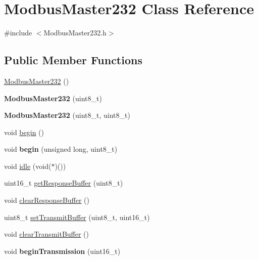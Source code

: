 \hypertarget{class_modbus_master232}{}\section{Modbus\+Master232 Class Reference}
\label{class_modbus_master232}


{\ttfamily \#include $<$Modbus\+Master232.\+h$>$}

\subsection*{Public Member Functions}
\begin{DoxyCompactItemize}
\item 
\hyperlink{class_modbus_master232_a2727d618f5d2cc3ad6a92031be79cc44}{Modbus\+Master232} ()
\item 
{\bfseries Modbus\+Master232} (uint8\+\_\+t)\hypertarget{class_modbus_master232_a9faa747630643b5283037a0b1895e34e}{}\label{class_modbus_master232_a9faa747630643b5283037a0b1895e34e}

\item 
{\bfseries Modbus\+Master232} (uint8\+\_\+t, uint8\+\_\+t)\hypertarget{class_modbus_master232_aaa220fa5c55723be7d78421753fdda84}{}\label{class_modbus_master232_aaa220fa5c55723be7d78421753fdda84}

\item 
void \hyperlink{class_modbus_master232_a9e9242efe51e3c96ff35e2cb6bb49e0e}{begin} ()
\item 
void {\bfseries begin} (unsigned long, uint8\+\_\+t)\hypertarget{class_modbus_master232_ae8f2ddaa227e71915feac0c5699d2337}{}\label{class_modbus_master232_ae8f2ddaa227e71915feac0c5699d2337}

\item 
void \hyperlink{class_modbus_master232_aea00d1ccb419fa79dc12eea85eb31119}{idle} (void($\ast$)())
\item 
uint16\+\_\+t \hyperlink{class_modbus_master232_a8a81721eda5ea13577b34b8c7eba73e9}{get\+Response\+Buffer} (uint8\+\_\+t)
\item 
void \hyperlink{class_modbus_master232_ada54b984965e9aba4262d06c9993abc6}{clear\+Response\+Buffer} ()
\item 
uint8\+\_\+t \hyperlink{class_modbus_master232_a69110f988209e27580f76823adbe1d0d}{set\+Transmit\+Buffer} (uint8\+\_\+t, uint16\+\_\+t)
\item 
void \hyperlink{class_modbus_master232_ad5a453d2eab7407f2b99bec5c983388f}{clear\+Transmit\+Buffer} ()
\item 
void {\bfseries begin\+Transmission} (uint16\+\_\+t)\hypertarget{class_modbus_master232_ad28812575f0ae01e323c6a904cbb440d}{}\label{class_modbus_master232_ad28812575f0ae01e323c6a904cbb440d}


\end{DoxyCompactItemize}
